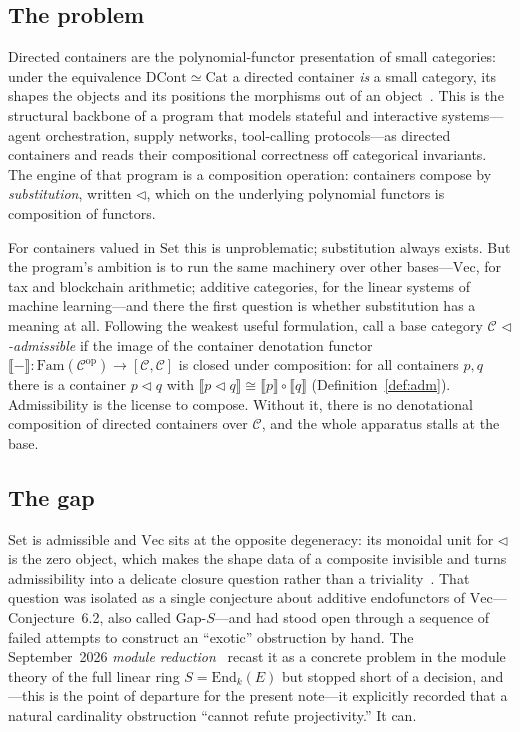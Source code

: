 \documentclass[11pt,reqno]{amsart}
\theoremstyle{plain}
\theoremstyle{definition}
\theoremstyle{remark}
\renewcommand{\Vec}{\mathrm{Vec}}
\newcommand{\Set}{\mathrm{Set}}
\newcommand{\Cat}{\mathrm{Cat}}
\newcommand{\Fam}{\mathrm{Fam}}
\newcommand{\End}{\mathrm{End}}
\newcommand{\op}{\mathrm{op}}
\newcommand{\tri}{\triangleleft}
\newcommand{\den}[1]{\llbracket #1 \rrbracket}
\newcommand{\C}{\mathcal{C}}
\begin{document}
\subsection*{The problem}
Directed containers are the polynomial-functor presentation of small categories: under the equivalence $\mathrm{DCont}\simeq\Cat$ a directed container \emph{is} a small category, its shapes the objects and its positions the morphisms out of an object~\cite{ahman-uustalu,shapiro-spivak}. This is the structural backbone of a program that models stateful and interactive systems---agent orchestration, supply networks, tool-calling protocols---as directed containers and reads their compositional correctness off categorical invariants. The engine of that program is a composition operation: containers compose by \emph{substitution}, written $\tri$, which on the underlying polynomial functors is composition of functors.

For containers valued in $\Set$ this is unproblematic; substitution always exists. But the program's ambition is to run the same machinery over other bases---$\Vec$, for tax and blockchain arithmetic; additive categories, for the linear systems of machine learning---and there the first question is whether substitution has a meaning at all. Following the weakest useful formulation, call a base category $\C$ \emph{$\tri$-admissible} if the image of the container denotation functor $\den{-}\colon\Fam(\C^{\op})\to[\C,\C]$ is closed under composition: for all containers $p,q$ there is a container $p\tri q$ with $\den{p\tri q}\cong\den{p}\circ\den{q}$ (Definition~\ref{def:adm}). Admissibility is the license to compose. Without it, there is no denotational composition of directed containers over $\C$, and the whole apparatus stalls at the base.

\subsection*{The gap}
$\Set$ is admissible and $\Vec$ sits at the opposite degeneracy: its monoidal unit for $\tri$ is the zero object, which makes the shape data of a composite invisible and turns admissibility into a delicate closure question rather than a triviality~\cite{macbeth-admissibility}. That question was isolated as a single conjecture about additive endofunctors of $\Vec$---Conjecture~6.2, also called Gap-$S$---and had stood open through a sequence of failed attempts to construct an ``exotic'' obstruction by hand. The September~2026 \emph{module reduction}~\cite{macbeth-reduction} recast it as a concrete problem in the module theory of the full linear ring $S=\End_k(E)$ but stopped short of a decision, and---this is the point of departure for the present note---it explicitly recorded that a natural cardinality obstruction ``cannot refute projectivity.'' It can.
\end{document}
